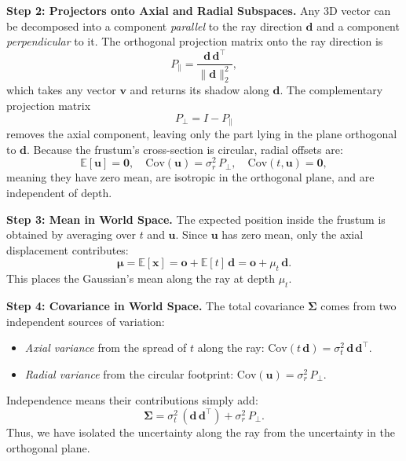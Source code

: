 \begin{enrichment}
\begin{enrichment}
    \medskip
    \noindent\textbf{Step 2: Projectors onto Axial and Radial Subspaces.}
    Any 3D vector can be decomposed into a component \emph{parallel} to the ray direction \(\mathbf{d}\) and a component \emph{perpendicular} to it.  
    The orthogonal projection matrix onto the ray direction is
    \[
    P_{\parallel} = \frac{\mathbf{d}\,\mathbf{d}^\top}{\|\mathbf{d}\|_2^{2}},
    \]
    which takes any vector \(\mathbf{v}\) and returns its shadow along \(\mathbf{d}\).  
    The complementary projection matrix
    \[
    P_{\perp} = I - P_{\parallel}
    \]
    removes the axial component, leaving only the part lying in the plane orthogonal to \(\mathbf{d}\).  
    Because the frustum’s cross-section is circular, radial offsets are:
    \[
    \mathbb{E}[\mathbf{u}] = \mathbf{0}, 
    \quad
    \mathrm{Cov}(\mathbf{u}) = \sigma_r^2\,P_{\perp}, 
    \quad
    \mathrm{Cov}(t,\mathbf{u}) = \mathbf{0},
    \]
    meaning they have zero mean, are isotropic in the orthogonal plane, and are independent of depth.
    
    \medskip
    \noindent\textbf{Step 3: Mean in World Space.}
    The expected position inside the frustum is obtained by averaging over \(t\) and \(\mathbf{u}\).  
    Since \(\mathbf{u}\) has zero mean, only the axial displacement contributes:
    \[
    \boldsymbol{\mu} 
    = \mathbb{E}[\mathbf{x}] 
    = \mathbf{o} + \mathbb{E}[t]\,\mathbf{d} 
    = \mathbf{o} + \mu_t\,\mathbf{d}.
    \]
    This places the Gaussian’s mean along the ray at depth \(\mu_t\).
    
    \medskip
    \noindent\textbf{Step 4: Covariance in World Space.}
    The total covariance \(\boldsymbol{\Sigma}\) comes from two independent sources of variation:
    \begin{itemize}
        \item \emph{Axial variance} from the spread of \(t\) along the ray: \(\mathrm{Cov}(t\,\mathbf{d}) = \sigma_t^2\,\mathbf{d}\,\mathbf{d}^\top\).
        \item \emph{Radial variance} from the circular footprint: \(\mathrm{Cov}(\mathbf{u}) = \sigma_r^2\,P_{\perp}\).
    \end{itemize}
    Independence means their contributions simply add:
    \[
    \boldsymbol{\Sigma} = \sigma_t^2\,(\mathbf{d}\,\mathbf{d}^\top) + \sigma_r^2\,P_{\perp}.
    \]
    Thus, we have isolated the uncertainty along the ray from the uncertainty in the orthogonal plane.
    

\end{enrichment}
\end{enrichment}

